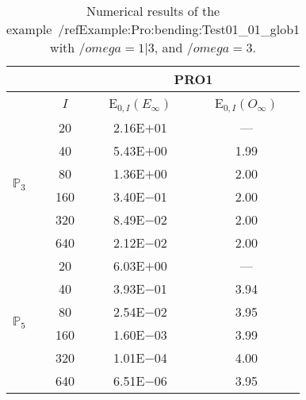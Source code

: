 \begin{table}[H]
\caption{Numerical results of the example~/ref{Example:Pro:bending:Test01_01_glob1} with $/omega=1|3$, and $/omega=3$.}
\setlength{\tabcolsep}{5pt}
\centering
\begin{tabular}{@{}l c c c@{}}
\toprule
 &  & \multicolumn{2}{c}{PRO1}\\
\midrule
 & $I$ & E$_{0,I}(E_{\infty})$ & E$_{0,I}(O_{\infty})$\\
\midrule
\multirow{6}{*}{$\mathbb{P}_{3}$}
 & 20 & 2.16E$+$01 & ---\\
 & 40 & 5.43E$+$00 & 1.99\\
 & 80 & 1.36E$+$00 & 2.00\\
 & 160 & 3.40E$-$01 & 2.00\\
 & 320 & 8.49E$-$02 & 2.00\\
 & 640 & 2.12E$-$02 & 2.00\\
\midrule
\multirow{6}{*}{$\mathbb{P}_{5}$}
 & 20 & 6.03E$+$00 & ---\\
 & 40 & 3.93E$-$01 & 3.94\\
 & 80 & 2.54E$-$02 & 3.95\\
 & 160 & 1.60E$-$03 & 3.99\\
 & 320 & 1.01E$-$04 & 4.00\\
 & 640 & 6.51E$-$06 & 3.95\\
\bottomrule
\end{tabular}
\label{Table:PRO:test_01_01_test33_pro1}
\end{table}
